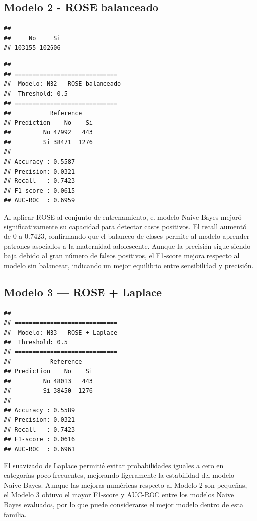\documentclass[
]{article}
\begin{document}
\subsection{Modelo 2 - ROSE
balanceado}\label{modelo-2---rose-balanceado}

\begin{verbatim}
## 
##     No     Si 
## 103155 102606
\end{verbatim}

\begin{verbatim}
## 
## =============================
##  Modelo: NB2 – ROSE balanceado 
##  Threshold: 0.5 
## =============================
##           Reference
## Prediction    No    Si
##         No 47992   443
##         Si 38471  1276
## 
## Accuracy : 0.5587 
## Precision: 0.0321 
## Recall   : 0.7423 
## F1-score : 0.0615 
## AUC-ROC  : 0.6959
\end{verbatim}

Al aplicar ROSE al conjunto de entrenamiento, el modelo Naive Bayes
mejoró significativamente su capacidad para detectar casos positivos. El
recall aumentó de 0 a 0.7423, confirmando que el balanceo de clases
permite al modelo aprender patrones asociados a la maternidad
adolescente. Aunque la precisión sigue siendo baja debido al gran número
de falsos positivos, el F1-score mejora respecto al modelo sin
balancear, indicando un mejor equilibrio entre sensibilidad y precisión.

\subsection{Modelo 3 --- ROSE + Laplace}\label{modelo-3-rose-laplace}

\begin{verbatim}
## 
## =============================
##  Modelo: NB3 – ROSE + Laplace 
##  Threshold: 0.5 
## =============================
##           Reference
## Prediction    No    Si
##         No 48013   443
##         Si 38450  1276
## 
## Accuracy : 0.5589 
## Precision: 0.0321 
## Recall   : 0.7423 
## F1-score : 0.0616 
## AUC-ROC  : 0.6961
\end{verbatim}

El suavizado de Laplace permitió evitar probabilidades iguales a cero en
categorías poco frecuentes, mejorando ligeramente la estabilidad del
modelo Naive Bayes. Aunque las mejoras numéricas respecto al Modelo 2
son pequeñas, el Modelo 3 obtuvo el mayor F1-score y AUC-ROC entre los
modelos Naive Bayes evaluados, por lo que puede considerarse el mejor
modelo dentro de esta familia.
\end{document}
